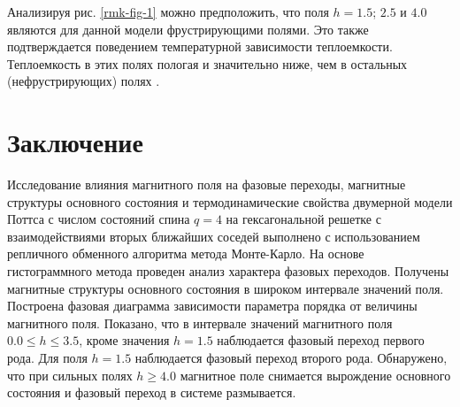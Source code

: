 Анализируя рис. \ref{rmk-fig-1} можно предположить, что поля $h = 1.5$; $2.5$ и $4.0$ являются для данной модели фрустрирующими полями. Это также подтверждается поведением температурной зависимости теплоемкости. Теплоемкость в этих полях пологая и значительно ниже, чем в остальных (нефрустрирующих) полях \cite{rmk-bib-4, rmk-bib-5}.


\section*{Заключение}

Исследование влияния магнитного поля на фазовые переходы, магнитные структуры основного состояния и термодинамические свойства двумерной модели Поттса с числом состояний спина $q = 4$ на гексагональной решетке с взаимодействиями вторых ближайших соседей выполнено с использованием репличного обменного алгоритма метода Монте-Карло. На основе гистограммного метода проведен анализ характера фазовых переходов. Получены магнитные структуры основного состояния в широком интервале значений поля. Построена фазовая диаграмма зависимости параметра порядка от величины магнитного поля. Показано, что в интервале значений магнитного поля $0.0 \leq h \leq 3.5$, кроме значения $h = 1.5$ наблюдается фазовый переход первого рода. Для поля $h = 1.5$ наблюдается фазовый переход второго рода. Обнаружено, что при сильных полях $h \geq 4.0$ магнитное поле снимается вырождение основного состояния и фазовый переход в системе размывается.
